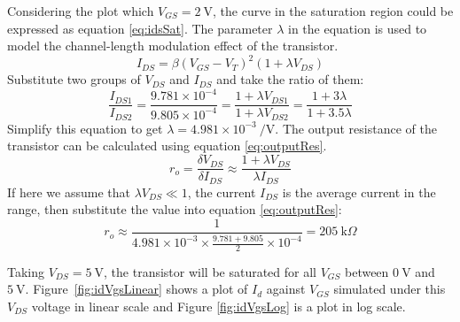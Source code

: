 \documentclass[12pt]{article}   %
\begin{document}
	Considering the plot which $V_{GS} = \SI{2}{\volt}$, the curve in the saturation region could be expressed as equation \eqref{eq:idsSat}. The parameter $\lambda$ in the equation is used to model the channel-length modulation effect of the transistor.
	\begin{equation}
		I_{DS} = \beta \left(V_{GS} - V_{T}\right)^2 \left(1 + \lambda V_{DS}\right)
		\label{eq:idsSat}
	\end{equation}
	Substitute two groups of $V_{DS}$ and $I_{DS}$ and take the ratio of them:
	\begin{equation}
		\frac{I_{DS1}}{I_{DS2}} = \frac{9.781 \times 10^{-4}}{9.805 \times 10^{-4}} = \frac{1 + \lambda V_{DS1}}{1 + \lambda V_{DS2}} = \frac{1 + 3\lambda}{1 + 3.5\lambda}
	\end{equation}
	Simplify this equation to get $\lambda = 4.981 \times 10^{-3}\ \si{\per\volt}$. The output resistance of the transistor can be calculated using equation \eqref{eq:outputRes}. 
	\begin{equation}
		r_o = \frac{\delta V_{DS}}{\delta I_{DS}} \approx \frac{1 + \lambda V_{DS}}{\lambda I_{DS}}
		\label{eq:outputRes}
	\end{equation}
	If here we assume that $\lambda V_{DS} \ll 1$, the current $I_{DS}$ is the average current in the range, then substitute the value into equation \eqref{eq:outputRes}:
	\begin{equation}
		r_o \approx \frac{1}{4.981 \times 10^{-3} \times \frac{9.781 + 9.805}{2} \times 10^{-4}} = \SI{205}{\kilo\Omega}
	\end{equation}
	
	Taking $V_{DS} = \SI{5}{\volt}$, the transistor will be saturated for all $V_{GS}$ between $\SI{0}{\volt}$ and $\SI{5}{\volt}$. Figure~\ref{fig:idVgsLinear} shows a plot of $I_{d}$ against $V_{GS}$ simulated under this $V_{DS}$ voltage in linear scale and Figure \ref{fig:idVgsLog} is a plot in log scale.
	
\end{document}
